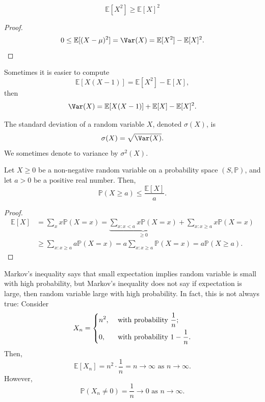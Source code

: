\begin{corollary}
    \[\mathbb{E} [X^2] \ge \mathbb{E} [X]^2\] 
\end{corollary}
\begin{proof}
    \[
        0 \le \mathbb{E} [(X - \mu )^2] = \Var(X) = \mathbb{E} [X^2] - \mathbb{E} [X]^2.
    \]
\end{proof}

\begin{remark}
    Sometimes it is easier to compute 
    \[
        \mathbb{E} [X(X - 1)] = \mathbb{E} [X^2] - \mathbb{E} [X],
    \]
    then 
    \[
        \Var(X) = \mathbb{E} [X(X-1)] + \mathbb{E} [X] - \mathbb{E} [X]^2.
    \]
\end{remark}

\begin{definition}
    The standard deviation of a random variable \(X\), denoted \(\sigma (X)\), is 
    \[
        \sigma (X) = \sqrt{\Var(X)}. 
    \]  
    We sometimes denote to variance by \(\sigma ^2(X)\). 
\end{definition}

\begin{proposition}
    Let \(X \ge 0\) be a non-negative random variable on a probability space \((S, \mathbb{P} )\), and let \(a > 0\) be a positive real number. Then, 
    \[
        \mathbb{P} (X \ge a) \le \frac{\mathbb{E} [X]}{a}.
    \]   
\end{proposition}

\begin{proof}
    \begin{align*}
        \mathbb{E} [X] &= \sum_{x} x \mathbb{P} (X = x) = \underbrace{\sum_{x: x < a} x\mathbb{P} (X = x)}_{\ge 0} + \sum_{x : x \ge a} x \mathbb{P} (X = x) \\
        &\ge \sum_{x: x \ge a} a \mathbb{P} (X = x) = a \sum_{x: x \ge a} \mathbb{P} (X = x)  = a \mathbb{P} (X \ge a).    
    \end{align*}
\end{proof}

\begin{remark}
    Markov's inequality says that small expectation implies random variable is small with high probability, but Markov's inequality does not say if expectation is large, then  random variable large with high probability. In fact, this is not always true: Consider 
    \[
        X_n = \begin{dcases}
            n^2, &\text{ with probability } \frac{1}{n} ;\\
            0, &\text{ with probability } 1 - \frac{1}{n} .
        \end{dcases}
    \]
    Then,
    \[
        \mathbb{E} [X_n] = n^2 \cdot \frac{1}{n} = n \to \infty \text{ as } n \to \infty. 
    \]
    However, 
    \[
        \mathbb{P} (X_n \neq 0) = \frac{1}{n} \to 0 \text{ as } n \to \infty. 
    \]
\end{remark}

